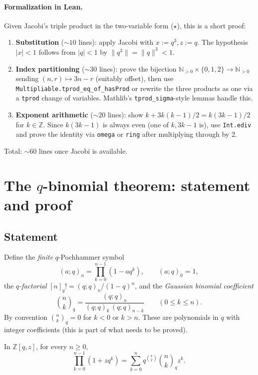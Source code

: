 \paragraph{Formalization in Lean.} Given Jacobi's triple product in the two-variable form ($\star$), this is a short proof:

\begin{enumerate}\item \textbf{Substitution} ($\sim 10$ lines): apply Jacobi with $x := q^3, z := q$. The hypothesis $|x| < 1$ follows from $|q| < 1$ by $\|q^3\| = \|q\|^3 < 1$.
\item \textbf{Index partitioning} ($\sim 30$ lines): prove the bijection $\mathbb{N}_{>0} \times \{0, 1, 2\} \to \mathbb{N}_{>0}$ sending $(n, r) \mapsto 3n - r$ (suitably offset), then use \texttt{Multipliable.tprod\_eq\_of\_hasProd} or rewrite the three products as one via a \texttt{tprod} change of variables. Mathlib's \texttt{tprod\_sigma}-style lemmas handle this.
\item \textbf{Exponent arithmetic} ($\sim 20$ lines): show $k + 3k(k-1)/2 = k(3k-1)/2$ for $k \in \mathbb{Z}$. Since $k(3k-1)$ is always even (one of $k, 3k-1$ is), use \texttt{Int.ediv} and prove the identity via \texttt{omega} or \texttt{ring} after multiplying through by 2.
\end{enumerate}

Total: $\sim 60$ lines once Jacobi is available.

\section{The $q$-binomial theorem: statement and proof}
\label{sec:qbin-proof}

\subsection{Statement}

Define the \emph{finite} $q$-Pochhammer symbol
\[
(a; q)_n = \prod_{k=0}^{n-1} (1 - a q^k), \qquad (a; q)_0 = 1,
\]
the \emph{$q$-factorial} $[n]_q! = (q;q)_n / (1-q)^n$, and the \emph{Gaussian binomial coefficient}
\[
\binom{n}{k}_q = \frac{(q; q)_n}{(q; q)_k \, (q; q)_{n-k}} \qquad (0 \leq k \leq n).
\]
By convention $\binom{n}{k}_q = 0$ for $k < 0$ or $k > n$. These are polynomials in $q$ with integer coefficients (this is part of what needs to be proved).

\begin{theorem}\label{thm:qbin-finite}\leanok{}
In $\mathbb{Z}[q, z]$, for every $n \geq 0$,
\[
\prod_{k=0}^{n-1} (1 + z q^k) = \sum_{k=0}^n q^{\binom{k}{2}} \binom{n}{k}_q z^k.
\]
\end{theorem}

